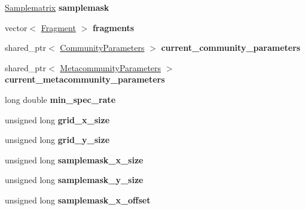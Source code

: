 \begin{DoxyCompactItemize}
\item 
\hyperlink{class_samplematrix}{Samplematrix} {\bfseries samplemask}\hypertarget{class_community_ac7434119a77086e3b38a4a94c8fbff01}{}\label{class_community_ac7434119a77086e3b38a4a94c8fbff01}

\item 
vector$<$ \hyperlink{struct_fragment}{Fragment} $>$ {\bfseries fragments}\hypertarget{class_community_a8a17909b92a0cec3b63cec41e92796cb}{}\label{class_community_a8a17909b92a0cec3b63cec41e92796cb}

\item 
shared\+\_\+ptr$<$ \hyperlink{struct_community_parameters}{Community\+Parameters} $>$ {\bfseries current\+\_\+community\+\_\+parameters}\hypertarget{class_community_a65cf7c27b28f342bdbe83a8005e78742}{}\label{class_community_a65cf7c27b28f342bdbe83a8005e78742}

\item 
shared\+\_\+ptr$<$ \hyperlink{struct_metacommunity_parameters}{Metacommunity\+Parameters} $>$ {\bfseries current\+\_\+metacommunity\+\_\+parameters}\hypertarget{class_community_a9db6ae78c8d173fd7a7224e76645f854}{}\label{class_community_a9db6ae78c8d173fd7a7224e76645f854}

\item 
long double {\bfseries min\+\_\+spec\+\_\+rate}\hypertarget{class_community_a9dc6f7d4ab75b382be85c2b74edac6b7}{}\label{class_community_a9dc6f7d4ab75b382be85c2b74edac6b7}

\item 
unsigned long {\bfseries grid\+\_\+x\+\_\+size}\hypertarget{class_community_a383dba82c8c76bf5c130c2bf4ac057e5}{}\label{class_community_a383dba82c8c76bf5c130c2bf4ac057e5}

\item 
unsigned long {\bfseries grid\+\_\+y\+\_\+size}\hypertarget{class_community_a308d12fa4ef95015860d4181b075c93f}{}\label{class_community_a308d12fa4ef95015860d4181b075c93f}

\item 
unsigned long {\bfseries samplemask\+\_\+x\+\_\+size}\hypertarget{class_community_a960bb6bb58eaec017d36d16cb3a3bc8a}{}\label{class_community_a960bb6bb58eaec017d36d16cb3a3bc8a}

\item 
unsigned long {\bfseries samplemask\+\_\+y\+\_\+size}\hypertarget{class_community_a10722b2fe8855460946f04f0ae69fd74}{}\label{class_community_a10722b2fe8855460946f04f0ae69fd74}

\item 
unsigned long {\bfseries samplemask\+\_\+x\+\_\+offset}\hypertarget{class_community_ac4985481c86bd62a50fa946699867216}{}\label{class_community_ac4985481c86bd62a50fa946699867216}


\end{DoxyCompactItemize}
